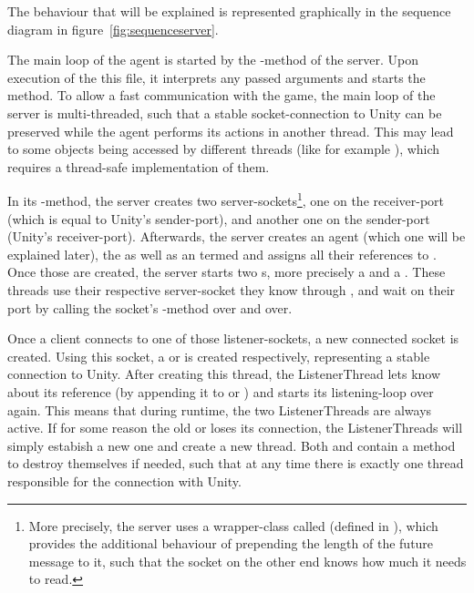 The behaviour that will be explained is represented graphically in the sequence diagram in figure~\ref{fig:sequenceserver}. 

The main loop of the agent is started by the -method of the server. Upon execution of the this file, it interprets any passed arguments and starts the method. %
To allow a fast communication with the game, the main loop of the server is multi-threaded, such that a stable socket-connection to Unity can be preserved while the agent performs its actions in another thread. This may lead to some objects being accessed by different threads (like for example ), which requires a thread-safe implementation of them.

In its -method, the server creates two server-sockets\footnote{More precisely, the server uses a wrapper-class called  (defined in ), which provides the additional behaviour of prepending the length of the future message to it, such that the socket on the other end knows how much it needs to read.}, one on the receiver-port (which is equal to Unity's sender-port), and another one on the sender-port (Unity's receiver-port). Afterwards, the server creates an agent (which one will be explained later), the   as well as an  termed  and assigns all their references to . Once those are created, the server starts two s, more precisely a  and a . These threads use their respective server-socket they know through , and wait on their port by calling the socket's -method over and over.

Once a client connects to one of those listener-sockets, a new connected socket is created. Using this socket, a  or  is created respectively, representing a stable connection to Unity. After creating this thread, the ListenerThread lets  know about its reference (by appending it to  or ) and starts its listening-loop over again. This means that during runtime, the two ListenerThreads are always active. If for some reason the old  or  loses its connection, the ListenerThreads will simply estabish a new one and create a new thread. Both  and   contain a method to destroy themselves if needed, such that at any time there is exactly one thread responsible for the connection with Unity.

